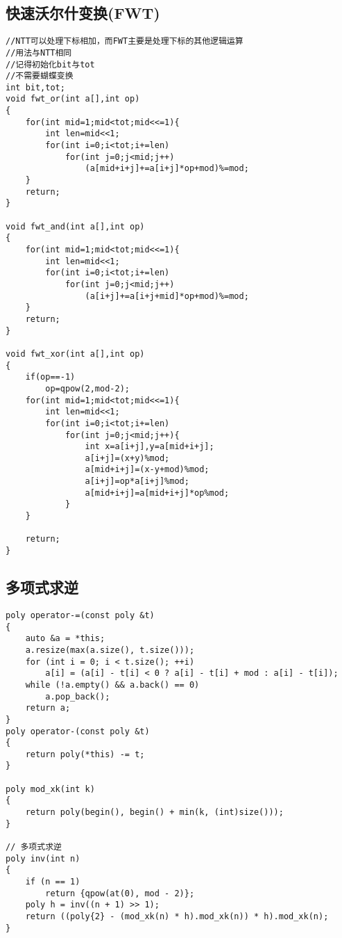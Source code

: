 \documentclass[twocolumn,a4]{article}
\begin{document}
\subsection{快速沃尔什变换(FWT)}
\begin{lstlisting}
//NTT可以处理下标相加，而FWT主要是处理下标的其他逻辑运算
//用法与NTT相同
//记得初始化bit与tot
//不需要蝴蝶变换
int bit,tot;
void fwt_or(int a[],int op)
{
    for(int mid=1;mid<tot;mid<<=1){
        int len=mid<<1;
        for(int i=0;i<tot;i+=len)
            for(int j=0;j<mid;j++)
                (a[mid+i+j]+=a[i+j]*op+mod)%=mod;
    }
    return;
}

void fwt_and(int a[],int op)
{
    for(int mid=1;mid<tot;mid<<=1){
        int len=mid<<1;
        for(int i=0;i<tot;i+=len)
            for(int j=0;j<mid;j++)
                (a[i+j]+=a[i+j+mid]*op+mod)%=mod;
    }
    return;
}

void fwt_xor(int a[],int op)
{
    if(op==-1)
        op=qpow(2,mod-2);
    for(int mid=1;mid<tot;mid<<=1){
        int len=mid<<1;
        for(int i=0;i<tot;i+=len)
            for(int j=0;j<mid;j++){
                int x=a[i+j],y=a[mid+i+j];
                a[i+j]=(x+y)%mod;
                a[mid+i+j]=(x-y+mod)%mod;
                a[i+j]=op*a[i+j]%mod;
                a[mid+i+j]=a[mid+i+j]*op%mod;
            }
    }

    return;
}
\end{lstlisting}

\subsection{多项式求逆}
\begin{lstlisting}
poly operator-=(const poly &t)
{
    auto &a = *this;
    a.resize(max(a.size(), t.size()));
    for (int i = 0; i < t.size(); ++i)
        a[i] = (a[i] - t[i] < 0 ? a[i] - t[i] + mod : a[i] - t[i]);
    while (!a.empty() && a.back() == 0)
        a.pop_back();
    return a;
}
poly operator-(const poly &t)
{
    return poly(*this) -= t;
}

poly mod_xk(int k)
{
    return poly(begin(), begin() + min(k, (int)size()));
}

// 多项式求逆
poly inv(int n)
{
    if (n == 1)
        return {qpow(at(0), mod - 2)};
    poly h = inv((n + 1) >> 1);
    return ((poly{2} - (mod_xk(n) * h).mod_xk(n)) * h).mod_xk(n);
}
\end{lstlisting}
\end{document}
